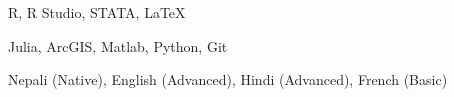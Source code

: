 
{R, R Studio, STATA, \LaTeX}
{}

{ Julia, ArcGIS, Matlab, Python, Git}
{}

{  Nepali (Native), English (Advanced), Hindi (Advanced), French (Basic)}
{}
